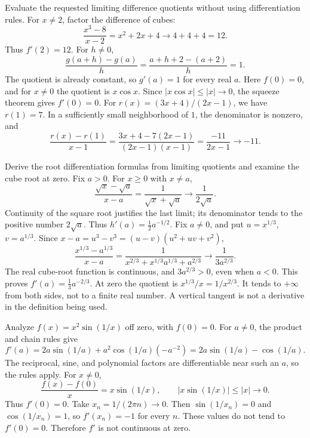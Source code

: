 \goal Evaluate the requested limiting difference quotients without using differentiation rules.
For $x\ne2$, factor the difference of cubes:
\[
 \frac{x^3-8}{x-2}=x^2+2x+4\longrightarrow4+4+4=12.
\]
Thus $f'(2)=12$.
For $h\ne0$,
\[
 \frac{g(a+h)-g(a)}h=\frac{a+h+2-(a+2)}h=1.
\]
The quotient is already constant, so $g'(a)=1$ for every real $a$.
Here $f(0)=0$, and for $x\ne0$ the quotient is $x\cos x$. Since $|x\cos x|\le |x|\to0$, the squeeze theorem gives $f'(0)=0$.
For $r(x)=(3x+4)/(2x-1)$, we have $r(1)=7$. In a sufficiently small neighborhood of $1$, the denominator is nonzero, and
\[
 \frac{r(x)-r(1)}{x-1}
 =\frac{3x+4-7(2x-1)}{(2x-1)(x-1)}
 =\frac{-11}{2x-1}\longrightarrow-11.
\]

\goal Derive the root differentiation formulas from limiting quotients and examine the cube root at zero.
Fix $a>0$. For $x\ge0$ with $x\ne a$,
\[
 \frac{\sqrt{x}-\sqrt a}{x-a}
 =\frac1{\sqrt x+\sqrt a}\longrightarrow\frac1{2\sqrt a}.
\]
Continuity of the square root justifies the last limit; its denominator tends to the positive number $2\sqrt a$. Thus $h'(a)=\tfrac12a^{-1/2}$.
Fix $a\ne0$, and put $u=x^{1/3}$, $v=a^{1/3}$. Since $x-a=u^3-v^3=(u-v)(u^2+uv+v^2)$,
\[
 \frac{x^{1/3}-a^{1/3}}{x-a}
 =\frac1{x^{2/3}+x^{1/3}a^{1/3}+a^{2/3}}
 \longrightarrow\frac1{3a^{2/3}}.
\]
The real cube-root function is continuous, and $3a^{2/3}>0$, even when $a<0$. This proves $f'(a)=\tfrac13a^{-2/3}$.
At zero the quotient is $x^{1/3}/x=1/x^{2/3}$. It tends to $+\infty$ from both sides, not to a finite real number. A vertical tangent is not a derivative in the definition being used.

\goal Analyze $f(x)=x^2\sin(1/x)$ off zero, with $f(0)=0$.
For $a\ne0$, the product and chain rules give
\[
 f'(a)=2a\sin(1/a)+a^2\cos(1/a)(-a^{-2})
      =2a\sin(1/a)-\cos(1/a).
\]
The reciprocal, sine, and polynomial factors are differentiable near such an $a$, so the rules apply.
For $x\ne0$,
\[
 \frac{f(x)-f(0)}{x}=x\sin(1/x),\qquad
 |x\sin(1/x)|\le |x|\longrightarrow0.
\]
Thus $f'(0)=0$.
Take $x_n=1/(2\pi n)\to0$. Then $\sin(1/x_n)=0$ and $\cos(1/x_n)=1$, so $f'(x_n)=-1$ for every $n$. These values do not tend to $f'(0)=0$. Therefore $f'$ is not continuous at zero.

